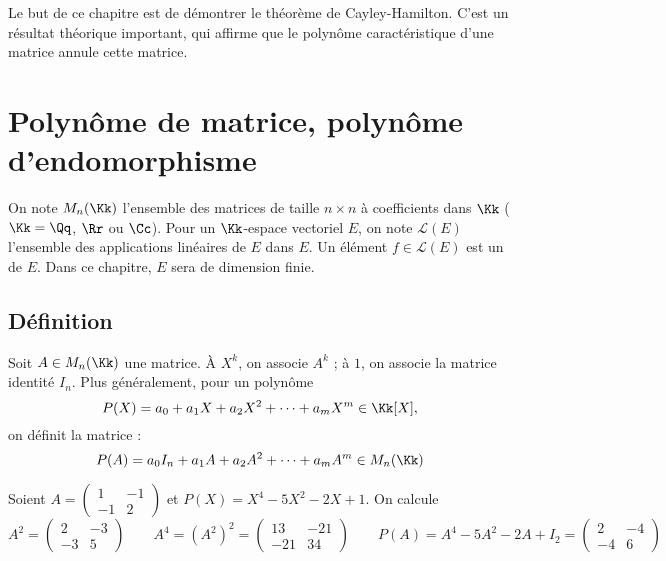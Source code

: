 \documentclass[12pt, class=report,crop=false]{standalone}
\begin{document}

Le but de ce chapitre est de démontrer le théorème de Cayley-Hamilton. 
C'est un résultat théorique important, qui affirme que le polynôme caractéristique d'une matrice annule cette matrice.


\section{Polynôme de matrice, polynôme d'endomorphisme}

On note $M_n(\Kk)$ l'ensemble des matrices de taille $n\times n$ à coefficients dans $\Kk$ 
($\Kk = \Qq$, $\Rr$ ou $\Cc$).
Pour un $\Kk$-espace vectoriel $E$, on note $\mathcal{L}(E)$ l'ensemble des applications linéaires de $E$ dans $E$. Un élément $f \in \mathcal{L}(E)$ est un  de $E$. Dans ce chapitre, $E$ sera de dimension finie.

\subsection{Définition}



Soit $A \in M_n(\Kk)$ une matrice.
\`A $X^k$, on associe $A^k$ ; à $1$, on associe la matrice identité $I_n$.
Plus généralement, pour un polynôme
\[P(X) = a_0 + a_1 X +a_2 X^2 + \cdots  + a_m X^m \in\Kk[X],\]
on définit la matrice :
\[P(A) = a_0 I_n +a_1 A +a_2 A^2 +  \cdots +a_m A^m \in M_n(\Kk) \] 
 
\begin{exemple}
Soient $A = \begin{pmatrix}1&-1\\-1&2\end{pmatrix}$ et $P(X) = X^4-5X^2-2X+1$. 
On calcule 
$$A^2 = \begin{pmatrix}
2 & -3 \\
-3 & 5
\end{pmatrix}
\qquad 
A^4 = (A^2)^2 = \begin{pmatrix}
13 & -21 \\
-21 & 34
\end{pmatrix}
\qquad
P(A) = A^4-5A^2-2A+I_2 = 
\begin{pmatrix}
2 & -4\\
-4 & 6
\end{pmatrix}
$$
\end{exemple}
\end{document}
